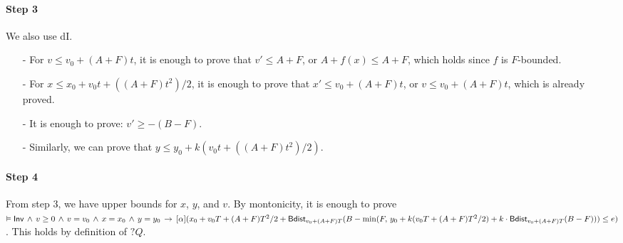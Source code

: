 \paragraph{Step 3} We also use dI.
\begin{itemize}
    \item[-] For $v \le v_0+(A+F)t$, it is enough to prove that $v' \le A+F$, or $A + f(x) \le A+F$, which holds since $f$ is $F$-bounded.
    \item[-] For $x \le x_0+v_0t+((A+F)t^2)/2$, it is enough to prove that $x' \le v_0+(A+F)t$, or $v \le v_0 +(A+F)t$, which is already proved.
    \item[-] It is enough to prove: $v' \ge -(B-F)$.
    \item[-] Similarly, we can prove that $y \le y_0+k(v_0t+((A+F)t^2)/2)$.
\end{itemize}

\paragraph{Step 4} From step 3, we have upper bounds for $x$, $y$, and $v$. By montonicity, it is enough to prove $\vDash \mathsf{Inv} \, \land \, v \ge 0 \, \land \, v=v_0 \, \land \, x=x_0 \, \land \, y=y_0 \,\rightarrow\, [\alpha] (x_0 + v_0T + (A + F)T^2/2 + \textsf{Bdist}_{v_0+(A+F)T}(B - \min(F, \, y_0 + k(v_0T + (A + F)T^2/2) + k \cdot \textsf{Bdist}_{v_0 + (A+F)T}(B-F))) \le e)$. This holds by definition of $?Q$.
